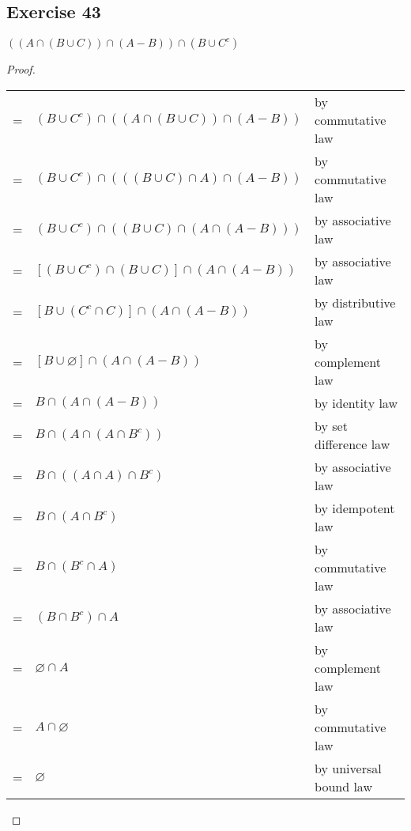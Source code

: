 \documentclass[14pt]{extarticle}
\newcommand{\es}{\varnothing}
\newcommand{\cy}{\color{cyan}}
\begin{document}
\subsection{Exercise 43}
\(((A \cap (B \cup C)) \cap (A - B)) \cap (B \cup C^c)\)

\begin{proof}
  \begin{center}
    \begin{tabular}{cll}
      = & \((B \cup C^c) \cap ((A \cap (B \cup C)) \cap (A - B)) \) & {\cy by commutative law}     \\
      = & \((B \cup C^c) \cap (((B \cup C) \cap A) \cap (A - B)) \) & {\cy by commutative law}     \\
      = & \((B \cup C^c) \cap ((B \cup C) \cap (A \cap (A - B))) \) & {\cy by associative law}     \\
      = & \([(B \cup C^c) \cap (B \cup C)] \cap (A \cap (A - B)) \) & {\cy by associative law}     \\
      = & \([B \cup (C^c \cap C)] \cap (A \cap (A - B)) \)          & {\cy by distributive law}    \\
      = & \([B \cup \es] \cap (A \cap (A - B)) \)                   & {\cy by complement law}      \\
      = & \(B \cap (A \cap (A - B)) \)                              & {\cy by identity law}        \\
      = & \(B \cap (A \cap (A \cap B^c)) \)                         & {\cy by set difference law}  \\
      = & \(B \cap ((A \cap A) \cap B^c) \)                         & {\cy by associative law}     \\
      = & \(B \cap (A \cap B^c) \)                                  & {\cy by idempotent law}      \\
      = & \(B \cap (B^c \cap A) \)                                  & {\cy by commutative law}     \\
      = & \((B \cap B^c) \cap A \)                                  & {\cy by associative law}     \\
      = & \(\es \cap A\)                                            & {\cy by complement law}      \\
      = & \(A \cap \es\)                                            & {\cy by commutative law}     \\
      = & \(\es\)                                                   & {\cy by universal bound law}
    \end{tabular}
  \end{center}
\end{proof}
\end{document}

